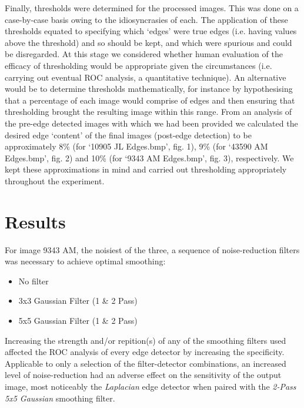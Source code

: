 \documentclass[a4paper]{article}
\newenvironment{floatfig}
  {\par\medskip\noindent\minipage{\linewidth}}
  {\endminipage\par\medskip}
\begin{document}
\begin{multicols*}{2}
Finally, thresholds were determined for the processed images. This was done on a case-by-case basis owing to the idiosyncrasies of each. The application of these thresholds equated to specifying which ‘edges’ were true edges (i.e. having values above the threshold) and so should be kept, and which were spurious and could be disregarded. At this stage we considered whether human evaluation of the efficacy of thresholding would be appropriate given the circumstances (i.e. carrying out eventual ROC analysis, a quantitative technique). An alternative would be to determine thresholds mathematically, for instance by hypothesising that a percentage of each image would comprise of edges and then ensuring that thresholding brought the resulting image within this range. From an analysis of the pre-edge detected images with which we had been provided we calculated the desired edge ‘content’ of the final images (post-edge detection) to be approximately 8\% (for ‘10905 JL Edges.bmp’, fig. 1), 9\% (for ‘43590 AM Edges.bmp’, fig. 2) and 10\% (for ‘9343 AM Edges.bmp’, fig. 3), respectively. We kept these approximations in mind and carried out thresholding appropriately throughout the experiment.

\section*{Results}

For image 9343 AM, the noisiest of the three, a sequence of noise-reduction filters was necessary to achieve optimal smoothing:

\begin{itemize}[noitemsep]
    \item No filter
    \item 3x3 Gaussian Filter (1 \& 2 Pass)
    \item 5x5 Gaussian Filter (1 \& 2 Pass)
\end{itemize}

\noindent Increasing the strength and/or repition(s) of any of the smoothing filters used affected the ROC analysis of every edge detector by increasing the specificity. Applicable to only a selection of the filter-detector combinations, an increased level of noise-reduction had an adverse effect on the sensitivity of the output image, most noticeably the \emph{Laplacian} edge detector when paired with the \emph{2-Pass 5x5 Gaussian} smoothing filter.

\vspace{.4em}
\begin{floatfig}
    \centering
\end{floatfig}


\end{multicols*}
\end{document}
